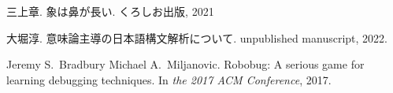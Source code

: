 \documentclass{jreport}
\begin{document}
% 
% 

\begin{thebibliography}{10}

三上章.
\newblock 象は鼻が長い.
\newblock くろしお出版, 2021

大堀淳.
\newblock 意味論主導の日本語構文解析について.
\newblock unpublished manuscript, 2022.

Jeremy S.~Bradbury Michael A.~Miljanovic.
\newblock Robobug: A serious game for learning debugging techniques.
\newblock In {\em the 2017 ACM Conference}, 2017.

\end{thebibliography}
\end{document}
